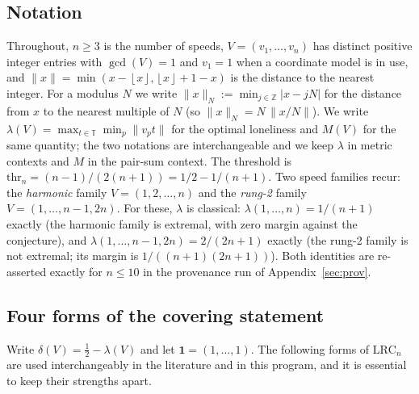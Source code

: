 \documentclass[11pt,a4paper]{article}
\numberwithin{equation}{section}
\theoremstyle{plain}
\theoremstyle{definition}
\theoremstyle{remark}
\newcommand{\Z}{\mathbb{Z}}
\newcommand{\T}{\mathbb{T}}
\newcommand{\floor}[1]{\left\lfloor #1 \right\rfloor}
\newcommand{\wn}[1]{\lVert #1 \rVert_{N}}
\newcommand{\wnc}[1]{\lVert #1 \rVert}
\newcommand{\lrc}{\mathrm{LRC}}
\begin{document}
\subsection{Notation}

Throughout, $n\ge 3$ is the number of speeds, $V=(v_1,\dots,v_n)$ has
distinct positive integer entries with $\gcd(V)=1$ and $v_1=1$ when a
coordinate model is in use, and $\wnc{x}=\min(x-\floor{x},
\floor{x}+1-x)$ is the distance to the nearest integer. For a modulus
$N$ we write $\wn{x}:=\min_{j\in\Z}|x-jN|$ for the distance from $x$ to
the nearest multiple of $N$ (so $\wn{x}=N\,\wnc{x/N}$). We write
$\lambda(V)=\max_{t\in\T}\min_p \wnc{v_p t}$ for the optimal loneliness
and $M(V)$ for the same quantity; the two notations are interchangeable
and we keep $\lambda$ in metric contexts and $M$ in the
pair-sum context. The threshold is
$\mathrm{thr}_n=(n-1)/(2(n+1))=1/2-1/(n+1)$. Two speed families recur:
the \emph{harmonic} family $V=(1,2,\dots,n)$ and the \emph{rung-2}
family $V=(1,\dots,n-1,2n)$. For these, $\lambda$ is classical:
$\lambda(1,\dots,n)=1/(n+1)$ exactly (the harmonic family is extremal,
with zero margin against the conjecture), and
$\lambda(1,\dots,n-1,2n)=2/(2n+1)$ exactly (the rung-2 family is not
extremal; its margin is $1/((n+1)(2n+1))$). Both identities are
re-asserted exactly for $n\le 10$ in the provenance run of
Appendix~\ref{sec:prov}.

\subsection{Four forms of the covering statement}

Write $\delta(V)=\tfrac12-\lambda(V)$ and let $\mathbf{1}=(1,\dots,1)$.
The following forms of $\lrc_n$ are used interchangeably in the
literature and in this program, and it is essential to keep their
strengths apart.
\end{document}
